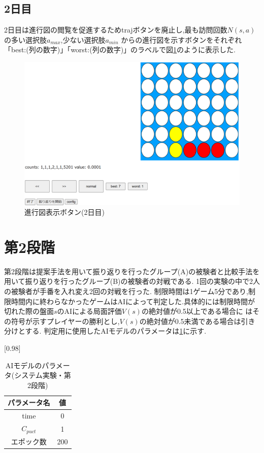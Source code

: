 \subsection{2日目}
2日目は進行図の閲覧を促進するためtrajボタンを廃止し,最も訪問回数$N(s,a)$の多い選択肢$a_{max}$,少ない選択肢$a_{min}$
からの進行図を示すボタンをそれぞれ「best:(列の数字)」「worst:(列の数字)」のラベルで図\ref{fig:best-worst}のように表示した.
\begin{figure}[t]
	\centering
	\includegraphics[width=\linewidth]{./figure/best-worst.png}
	\caption{進行図表示ボタン(2日目)}
	\label{fig:best-worst}
\end{figure}
\section{第2段階}
第2段階は提案手法を用いて振り返りを行ったグループ(A)の被験者と比較手法を用いて振り返りを行ったグループ(B)の被験者の対戦である.
1回の実験の中で2人の被験者が手番を入れ変え2回の対戦を行った.
制限時間は1ゲーム5分であり,制限時間内に終わらなかったゲームはAIによって判定した.具体的には制限時間が切れた際の盤面$s$のAIによる局面評価$V(s)$の絶対値が0.5以上である場合に
はその符号が示すプレイヤーの勝利とし,$V(s)$の絶対値が0.5未満である場合は引き分けとする.
判定用に使用したAIモデルのパラメータは\ref{table:param-judge}に示す.
\begin{table}[H]
	\caption{AIモデルのパラメータ(システム実験・第2段階)}
    \label{table:param-judge}
	\centering
	\scalebox{0.98}[0.98]{
		\begin{tabular}{c|c}
			パラメータ名 & 値 \\ \hline
			time    & 0\\ 
			$C_{puct}$    & 1 \\
            エポック数 & 200 \\
		\end{tabular}
	}
	
\end{table}


